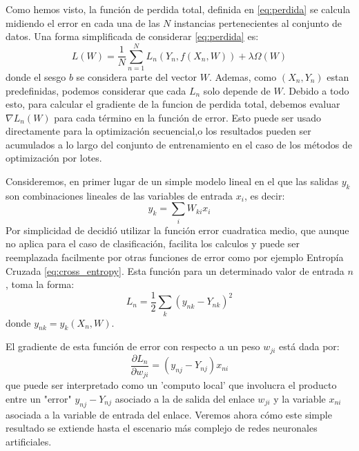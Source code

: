 \documentclass[a4paper,11pt,spanish]{book}
\begin{document}
	Como hemos visto, la función de perdida total, definida en \eqref{eq:perdida} se calcula midiendo el error en cada una de las $N$ instancias pertenecientes al conjunto de datos.
	Una forma simplificada de considerar \eqref{eq:perdida} es:
	\begin{equation} \label {eq:perdida_simplificada}
	  L(W) = \frac{1}{N}\sum_{n=1}^{N} L_n(Y_n, f(X_n, W)) + \lambda \Omega(W)
	\end{equation}
	donde el sesgo $b$ se considera parte del vector $W$. Ademas, como $(X_n, Y_n)$ estan predefinidas, podemos considerar que cada $L_n$ solo depende de $W$.
	Debido a todo esto, para calcular el gradiente de la funcion de perdida total, debemos evaluar $\nabla L_n(W)$ para cada término en la función de error. 
	Esto puede ser usado directamente para la optimización secuencial,o los resultados pueden ser acumulados a lo largo  del conjunto de entrenamiento en el caso de los métodos de optimización por lotes.
	
	Consideremos, en primer lugar de un simple modelo lineal en el que las salidas $y_k$ son combinaciones lineales de las variables de entrada $x_i$, es decir:
	\begin{equation*}
	  y_k = \sum_i W_{ki} x_i
	\end{equation*}
	Por simplicidad de decidió utilizar la función error cuadratica medio, que aunque no aplica para el caso de clasificación, facilita los calculos y puede
	ser reemplazada facilmente por otras funciones de error como por ejemplo Entropía Cruzada \eqref{eq:cross_entropy}. 
	Esta función para un determinado valor de entrada $n$, toma la forma:
	\begin{equation*}
	  L_n = \frac{1}{2} \sum_k (y_{nk}-Y_{nk})^2   %
	\end{equation*}
	donde $y_{nk} = y_{k} (X_n , W)$.
	
	El gradiente de esta función de error con respecto a un peso $w_{ji}$ está dada por:
	\begin{equation*}
	  \frac{\partial L_n}{\partial w_{ji}} = (y_{nj} − Y_{nj}) x_{ni}
	\end{equation*}
	que puede ser interpretado como un 'computo local' que involucra el producto entre un "error" $y_{nj} − Y_{nj}$ asociado a la de salida del enlace $w_{ji}$ y la variable $x_{ni}$
	asociada a la variable de entrada del enlace.
	Veremos ahora cómo este simple resultado se extiende hasta el escenario más complejo de redes neuronales artificiales.
\end{document}
